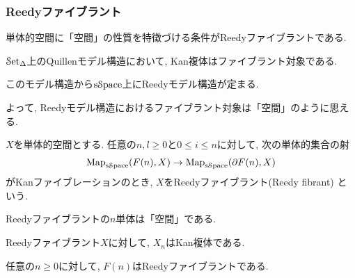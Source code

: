\documentclass[aspectratio=169, dvipdfmx, 8pt, notheorems, uplatex]{beamer}
\begin{document}
\begin{frame}
  \frametitle{Reedyファイブラント}

  単体的空間に「空間」の性質を特徴づける条件がReedyファイブラントである. 

  \begin{block}{}
    $\mathcal{S}\mathrm{et}_{\Delta}$上のQuillenモデル構造において, Kan複体はファイブラント対象である.

    このモデル構造から$\mathrm{s}\mathcal{S}\mathrm{pace}$上にReedyモデル構造が定まる. 

    よって, Reedyモデル構造におけるファイブラント対象は「空間」のように思える. 
  \end{block}

  \begin{definition}[Reedyファイブラント]
    $X$を単体的空間とする. 
    任意の$n,l \geq 0$と$0 \leq i \leq n$に対して, 次の単体的集合の射 
    \begin{align*}
      \mathrm{Map}_{\mathrm{s}\mathcal{S}\mathrm{pace}}(F(n),X) \to \mathrm{Map}_{\mathrm{s}\mathcal{S}\mathrm{pace}}(\partial F(n),X)  
    \end{align*}
    がKanファイブレーションのとき, $X$をReedyファイブラント(Reedy fibrant)
    という. 
  \end{definition}

  Reedyファイブラントの$n$単体は「空間」である. 

  \begin{theorem}
    Reedyファイブラント$X$に対して, $X_n$はKan複体である.
  \end{theorem}

  \begin{example}
    任意の$n \geq 0$に対して, $F(n)$はReedyファイブラントである. 
  \end{example}

\end{frame}
\end{document}
